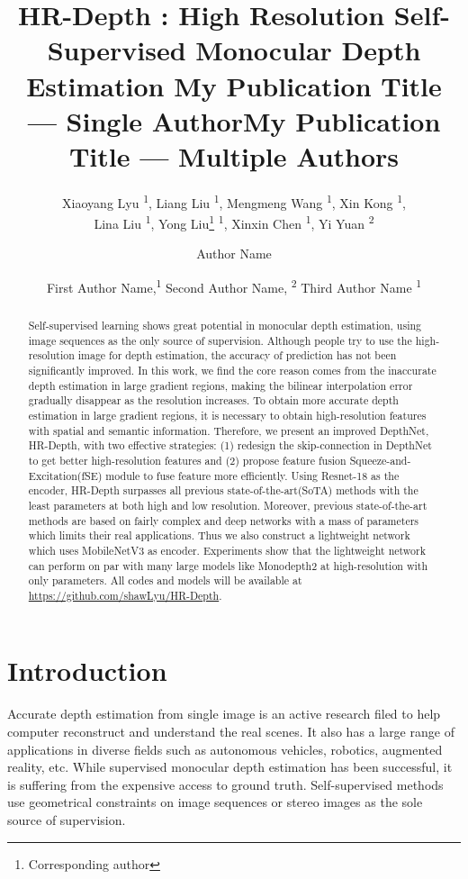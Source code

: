 \documentclass[letterpaper]{article} \usepackage{aaai21}  \usepackage{times}  \usepackage{helvet} \usepackage{courier}  \usepackage[hyphens]{url}  \usepackage{graphicx} \urlstyle{rm} \def\UrlFont{\rm}  \usepackage{natbib}  \usepackage{caption} \frenchspacing  \setlength{\pdfpagewidth}{8.5in}  \setlength{\pdfpageheight}{11in}  \usepackage{booktabs}
\title{ HR-Depth : High Resolution Self-Supervised Monocular Depth Estimation }
\author {
Xiaoyang Lyu \textsuperscript{\rm 1},
    Liang Liu \textsuperscript{\rm 1},
    Mengmeng Wang \textsuperscript{\rm 1},
    Xin Kong \textsuperscript{\rm 1}, \\
    Lina Liu \textsuperscript{\rm 1},
    Yong Liu\footnote{Corresponding author} \textsuperscript{\rm 1},
    Xinxin Chen \textsuperscript{\rm 1},
    Yi Yuan \textsuperscript{\rm 2} \\
}
\title{My Publication Title --- Single Author}
\author {
Author Name \\
}
\title{My Publication Title --- Multiple Authors}
\author {


        First Author Name,\textsuperscript{\rm 1}
        Second Author Name, \textsuperscript{\rm 2}
        Third Author Name \textsuperscript{\rm 1} \\
}
\begin{document}
\maketitle

\begin{abstract}
    Self-supervised learning shows great potential in monocular depth estimation, using image sequences as the only source of supervision. Although people
    try to use the high-resolution image for depth estimation, the accuracy of prediction has not been significantly improved. In this work, we find the core reason
    comes from the inaccurate depth estimation in large gradient regions, making the bilinear interpolation error gradually disappear as the resolution increases.
    To obtain more accurate depth estimation in large gradient regions, it is necessary to obtain high-resolution features with spatial and semantic information. 
    Therefore, we present an improved DepthNet, HR-Depth, with two effective strategies: (1) redesign the skip-connection in DepthNet to get better high-resolution
    features and (2) propose feature fusion Squeeze-and-Excitation(fSE) module to fuse feature more efficiently. Using Resnet-18 as the encoder, HR-Depth surpasses 
    all previous state-of-the-art(SoTA) methods with the least parameters at both high and low resolution. Moreover, previous state-of-the-art methods are based on fairly
    complex and deep networks with a mass of parameters which limits their real applications. Thus we also construct a lightweight network which uses MobileNetV3 as
    encoder. Experiments show that the lightweight network can perform on par with many large models like Monodepth2 at high-resolution with only  parameters.
    All codes and models will be available at \url{https://github.com/shawLyu/HR-Depth}.
\end{abstract}
\section{Introduction}
Accurate depth estimation from single image is an active research filed to help computer reconstruct and understand the real scenes. It also has a large range of 
applications in diverse fields such as autonomous vehicles, robotics, augmented reality, etc. While supervised monocular depth estimation has been successful, it is 
suffering from the expensive access to ground truth. Self-supervised methods use geometrical constraints on image sequences or stereo images as the sole source of 
supervision. 
\end{document}

